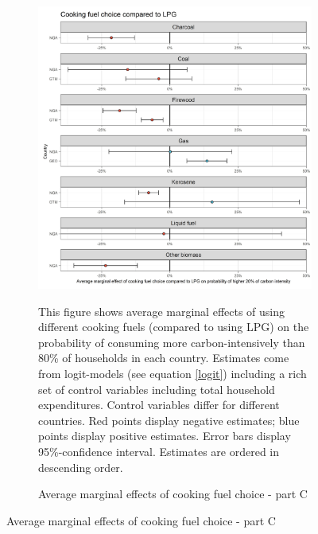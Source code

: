  \begin{figure}[ht!]\ContinuedFloat
   \centering
   \begin{subfigure}[b]{\textwidth}
   \centering
   \caption{Average marginal effects of cooking fuel choice - part C} \label{fig:Logit_ME_CF_3}
   \includegraphics{1_Figures/Analysis_Logit_Models_Marginal_Effects/Average_Marginal_Effects_affected_upper_80_CF_LPG_2017.jpg}
   \begin{subcaption2}
     This figure shows average marginal effects of using different cooking fuels (compared to using LPG) on the probability of consuming more carbon-intensively than 80\% of households in each country. Estimates come from logit-models (see equation \ref{logit}) including a rich set of control variables including total household expenditures. Control variables differ for different countries. Red points display negative estimates; blue points display positive estimates. Error bars display 95\%-confidence interval. Estimates are ordered in descending order.
   \end{subcaption2}
   \end{subfigure}
 \end{figure}
 \clearpage

